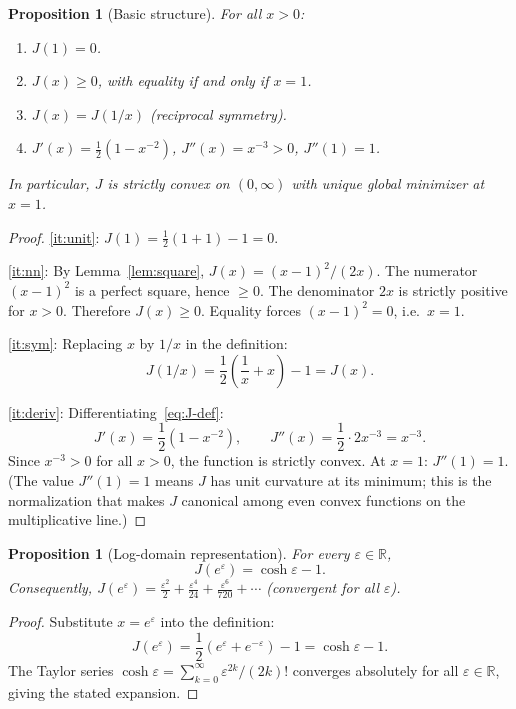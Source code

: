\documentclass[11pt]{amsart}
\newtheorem{proposition}[theorem]{Proposition}
\theoremstyle{definition}
\theoremstyle{remark}
\newcommand{\R}{\mathbb{R}}
\begin{document}
\begin{proposition}[Basic structure]\label{prop:basic}
For all $x>0$:
\begin{enumerate}[label=\textup{(\alph*)},nosep]
\item\label{it:unit} $J(1)=0$.
\item\label{it:nn} $J(x)\ge0$, with equality if and only if $x=1$.
\item\label{it:sym} $J(x)=J(1/x)$ \textup{(reciprocal symmetry)}.
\item\label{it:deriv} $J'(x)=\frac12(1-x^{-2})$, $J''(x)=x^{-3}>0$, $J''(1)=1$.
\end{enumerate}
In particular, $J$ is strictly convex on $(0,\infty)$ with unique global
minimizer at $x=1$.
\end{proposition}
\begin{proof}
\ref{it:unit}: $J(1)=\frac12(1+1)-1=0$.

\ref{it:nn}: By Lemma~\ref{lem:square}, $J(x)=(x-1)^2/(2x)$.
The numerator $(x-1)^2$ is a perfect square, hence $\ge0$.
The denominator $2x$ is strictly positive for $x>0$.
Therefore $J(x)\ge0$.  Equality forces $(x-1)^2=0$, i.e.\ $x=1$.

\ref{it:sym}: Replacing $x$ by $1/x$ in the definition:
\[
J(1/x)=\frac12\!\left(\frac1x+x\right)-1=J(x).
\]

\ref{it:deriv}: Differentiating~\eqref{eq:J-def}:
\[
J'(x)=\frac12\!\left(1-x^{-2}\right),\qquad
J''(x)=\frac12\cdot 2x^{-3}=x^{-3}.
\]
Since $x^{-3}>0$ for all $x>0$, the function is strictly convex.
At $x=1$: $J''(1)=1$.  (The value $J''(1)=1$ means $J$ has unit curvature
at its minimum; this is the normalization that makes $J$ canonical among
even convex functions on the multiplicative line.)
\end{proof}

\begin{proposition}[Log-domain representation]\label{prop:cosh}
For every $\varepsilon\in\R$,
\begin{equation}\label{eq:cosh}
J(e^\varepsilon)=\cosh\varepsilon-1.
\end{equation}
Consequently, $J(e^\varepsilon)=\frac{\varepsilon^2}{2}+\frac{\varepsilon^4}{24}
+\frac{\varepsilon^6}{720}+\cdots$ \textup{(}convergent for all $\varepsilon$\textup{)}.
\end{proposition}
\begin{proof}
Substitute $x=e^\varepsilon$ into the definition:
\[
J(e^\varepsilon)
=\frac12\!\left(e^\varepsilon+e^{-\varepsilon}\right)-1
=\cosh\varepsilon-1.
\]
The Taylor series $\cosh\varepsilon=\sum_{k=0}^\infty\varepsilon^{2k}/(2k)!$
converges absolutely for all $\varepsilon\in\R$, giving the stated expansion.
\end{proof}
\end{document}
